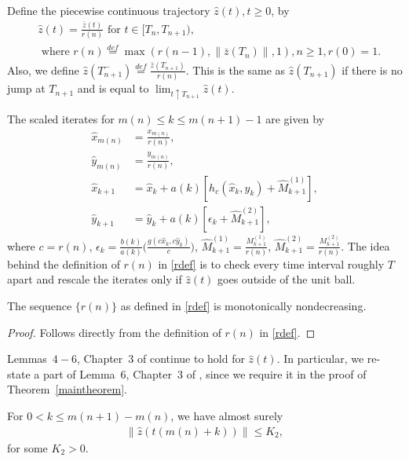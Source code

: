\begin{definition}\label{defs}
Define the piecewise continuous trajectory $\hat{z}(t), t\geq 0$, by
\begin{align}\label{hattraj}
&\hat{z}(t) = \frac{\bar{z}(t)}{r(n)} \text{~for~} t \in [T_n, T_{n+1}),\\
\label{rdef}&\text{~where~} r(n)\stackrel{def}{=}\max(r(n-1),\parallel \bar{z}(T_n)\parallel,1), 
n \geq 1, r(0)=1.
\end{align}
Also, we define $\hat{z}(T^{-}_{n+1})\stackrel{def}{=}\frac{\bar{z}(T_{n+1})}{r(n)}$. This is the same 
as $\hat{z}(T_{n+1})$ if there is no jump at $T_{n+1}$ and is equal to $\lim_{t\uparrow T_{n+1}}\hat{z}(t)$.
\end{definition}
The scaled iterates for $m(n)\leq k \leq m(n+1)-1$ are given by
\begin{subequations}\label{scaledttsarec}
\begin{align}
\hat{x}_{m(n)}&=\frac{x_{m(n)}}{r(n)},\\
\hat{y}_{m(n)}&=\frac{y_{m(n)}}{r(n)},\\
\hat{x}_{k+1}&=\hat{x}_k+a(k)[{h}_c(\hat{x}_k,\hat{y}_k)+\hat{M}^{(1)}_{k+1}],\\
\hat{y}_{k+1}&=\hat{y}_k+a(k)[\epsilon_k+\hat{M}^{(2)}_{k+1}],
\end{align}
\end{subequations}
where $c=r(n)$, $\epsilon_k=\frac{b(k)}{a(k)}\bigg(\frac{g(c\hat{x}_k,c\hat{y}_k)}{c}\bigg)$, $\hat{M}^{(1)}_{k+1}=\frac{M^{(1)}_{k+1}}{r(n)}$, $\hat{M}^{(2)}_{k+1}=\frac{M^{(2)}_{k+1}}{r(n)}$. 
The idea behind the definition of $r(n)$ in \eqref{rdef} is to check every time interval roughly $T$ apart and rescale the iterates only if $\hat{z}(t)$ goes outside of the unit ball.
\begin{lemma}\label{monotoner}
The sequence $\{r(n)\}$ as defined in \eqref{rdef} is monotonically nondecreasing.
\end{lemma}
\begin{proof}
Follows directly from the definition of $r(n)$ in \eqref{rdef}.
\end{proof}
Lemmas~$4-6$, Chapter~$3$ of \cite{SA} continue to hold for $\hat{z}(t)$. In particular, we re-state a part 
of Lemma~$6$, Chapter~$3$ of \cite{SA}, since we require it in the proof of Theorem~\ref{maintheorem}.
\begin{lemma}\label{bdd}
For $0<k\leq m(n+1)-m(n)$, we have almost surely
\begin{align}
\parallel \hat{z}(t(m(n)+k))\parallel \leq K_2,
\end{align}
for some $K_2>0$.
\end{lemma}

